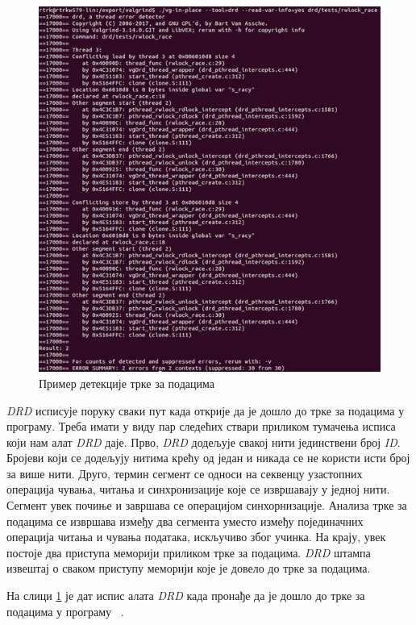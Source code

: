 \documentclass[12pt,oneside]{memoir}
\begin{document}
\begin{figure}[h!]
\begin{center}
\includegraphics[scale=0.75]{slika20.png}
\end{center}
\caption{Пример детекције трке за подацима}
\label{fig:drd-data-race}
\end{figure}

\indent \textit{DRD} исписује поруку сваки пут када открије да је дошло до трке за подацима у програму. Треба имати у виду пар следећих ствари приликом тумачења исписа који нам алат \textit{DRD} даје. Прво, \textit{DRD} додељује свакој нити јединствени број \textit{ID}. Бројеви који се додељују нитима крећу од један и никада се не користи исти број за више нити. Друго, термин сегмент се односи на секвенцу узастопних операција чувања, читања и синхронизације које се извршавају у једној нити. Сегмент увек почиње и завршава се операцијом синхорнизације. Анализа трке за подацима се извршава између два сегмента уместо између појединачних операција читања и чувања података, искључиво због учинка. На крају, увек постоје два приступа меморији приликом трке за подацима. \textit{DRD} штампа извештај о сваком приступу меморији које је довело до трке за подацима.

\indent На слици \ref{fig:drd-data-race} је дат испис алата \textit{DRD} када пронађе да је дошло до трке за подацима у програму ~\cite{drdRef}.
\end{document}
